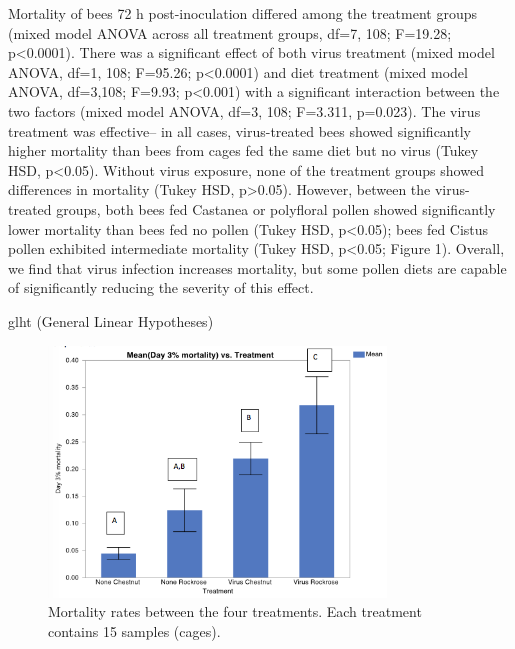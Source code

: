 \documentclass[11pt,a4paper,oldfontcommands,openany]{memoir}
\numberwithin{equation}{section} %
\begin{document}
Mortality of bees 72 h post-inoculation differed among the treatment groups (mixed model ANOVA across all treatment groups, df=7, 108; F=19.28; p<0.0001). There was a significant effect of both virus treatment (mixed model ANOVA, df=1, 108; F=95.26; p<0.0001) and diet treatment (mixed model ANOVA, df=3,108; F=9.93; p<0.001) with a significant interaction between the two factors (mixed model ANOVA, df=3, 108; F=3.311, p=0.023). The virus treatment was effective-- in all cases, virus-treated bees showed significantly higher mortality than bees from cages fed the same diet but no virus (Tukey HSD, p<0.05). Without virus exposure, none of the treatment groups showed differences in mortality (Tukey HSD, p>0.05). However, between the virus-treated groups, both bees fed Castanea or polyfloral pollen showed significantly lower mortality than bees fed no pollen (Tukey HSD, p<0.05); bees fed Cistus pollen exhibited intermediate mortality (Tukey HSD, p<0.05; Figure 1). Overall, we find that virus infection increases mortality, but some pollen diets are capable of significantly reducing the severity of this effect.

glht (General Linear Hypotheses)





\begin{figure}[H]
\centering
  \begin{framed}
  \includegraphics[width=0.8\textwidth]{Images/mortalityAll}
  \end{framed}
  \caption{Mortality rates between the four treatments. Each treatment contains 15 samples (cages).}
  \label{fig:mortalityAll}
\end{figure}
\end{document}
